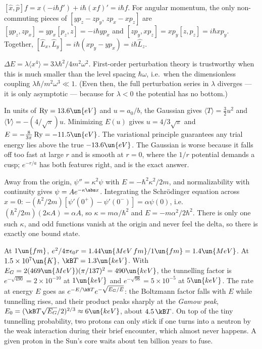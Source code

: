  $[\hat x,\hat p]f = x(-i\hbar f') + i\hbar(xf)' = i\hbar f$. For angular momentum, the only non-commuting pieces of $[yp_z - zp_y,\,zp_x - xp_z]$ are $[yp_z, zp_x] = yp_x[p_z,z] = -i\hbar yp_x$ and $[zp_y, xp_z] = xp_y[z,p_z] = i\hbar xp_y$. Together, $[\hat L_x,\hat L_y] = i\hbar(xp_y - yp_x) = i\hbar\hat L_z$.

 $\Delta E = \lambda\langle x^4\rangle = 3\lambda\hbar^2/4m^2\omega^2$. First-order perturbation theory is trustworthy when this is much smaller than the level spacing $\hbar\omega$, i.e.\ when the dimensionless coupling $\lambda\hbar/m^2\omega^3\ll1$. (Even then, the full perturbation series in $\lambda$ diverges --- it is only asymptotic --- because for $\lambda<0$ the potential has no bottom.)

 In units of $\mathrm{Ry} = 13.6\un{eV}$ and $u = a_0/b$, the Gaussian gives $\langle T\rangle = \tfrac32u^2$ and $\langle V\rangle = -(4/\sqrt\pi)u$. Minimizing $E(u)$ gives $u = 4/3\sqrt\pi$ and $E = -\tfrac{8}{3\pi}\,\mathrm{Ry} = -11.5\un{eV}$. The variational principle guarantees any trial energy lies above the true $-13.6\un{eV}$. The Gaussian is worse because it falls off too fast at large $r$ and is smooth at $r = 0$, where the $1/r$ potential demands a cusp; $e^{-r/a}$ has both features right, and is the exact answer.

 Away from the origin, $\psi'' = \kappa^2\psi$ with $E = -\hbar^2\kappa^2/2m$, and normalizability with continuity gives $\psi = Ae^{-\kappa\abs x}$. Integrating the Schr\"odinger equation across $x = 0$: $-(\hbar^2/2m)[\psi'(0^+)-\psi'(0^-)] = \alpha\psi(0)$, i.e.\ $(\hbar^2/2m)(2\kappa A) = \alpha A$, so $\kappa = m\alpha/\hbar^2$ and $E = -m\alpha^2/2\hbar^2$. There is only one such $\kappa$, and odd functions vanish at the origin and never feel the delta, so there is exactly one bound state.

 At $1\un{fm}$, $e^2/4\pi\epsilon_0r = 1.44\un{MeV\,fm}/1\un{fm} = 1.4\un{MeV}$. At $1.5\times10^7\un{K}$, $\kB T = 1.3\un{keV}$. With $E_G = 2(469\un{MeV})(\pi/137)^2 = 490\un{keV}$, the tunnelling factor is $e^{-\sqrt{490}} = 2\times10^{-10}$ at $1\un{keV}$ and $e^{-\sqrt{98}} = 5\times10^{-5}$ at $5\un{keV}$. The rate at energy $E$ goes as $e^{-E/\kB T}e^{-\sqrt{E_G/E}}$: the Boltzmann factor falls with $E$ while tunnelling rises, and their product peaks sharply at the \emph{Gamow peak}, $E_0 = (\kB T\sqrt{E_G}/2)^{2/3}\approx6\un{keV}$, about $4.5\,\kB T$. On top of the tiny tunnelling probability, two protons can only stick if one turns into a neutron by the weak interaction during their brief encounter, which almost never happens. A given proton in the Sun's core waits about ten billion years to fuse.

